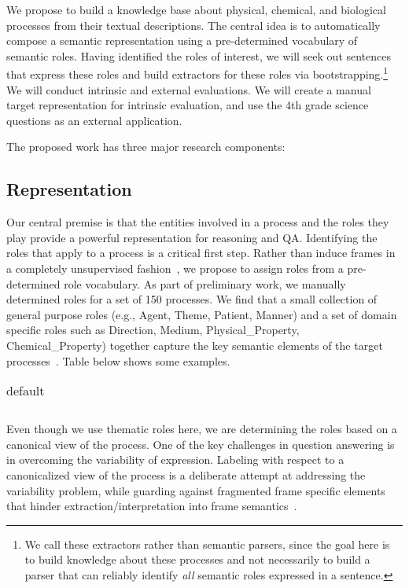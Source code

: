 We propose to build a knowledge base about physical, chemical, and biological processes from their textual descriptions. 
The central idea is to automatically compose a semantic representation using a pre-determined vocabulary of semantic roles. 
Having identified the roles of interest, we will seek out sentences that express these roles and build extractors for these roles via bootstrapping.\footnote{
We call these extractors rather than semantic parsers, since the goal here is to build knowledge about these processes and 
not necessarily to build a parser that can reliably identify {\em all} semantic roles expressed in a sentence.} 
We will conduct intrinsic and external evaluations. 
We will create a manual target representation for intrinsic evaluation, and use the 4th grade science questions as an external application.

The proposed work has three major research components:

\subsection{Representation}

Our central premise is that the entities involved in a process and the roles they play provide a powerful representation for reasoning and QA. 
Identifying the roles that apply to a process is a critical first step. 
Rather than induce frames in a completely unsupervised fashion~\cite{oconnonr2013:arxiv,modi2012:naacl,chen2013:ASRU}, 
we propose to assign roles from a pre-determined role vocabulary. 
As part of preliminary work, we manually determined roles for a set of 150 processes. 
We find that a small collection of general purpose roles (e.g., Agent, Theme, Patient, Manner) and 
a set of domain specific roles such as Direction, Medium, Physical\_Property, Chemical\_Property)  
together capture the key semantic elements of the target processes~\cite{louvan2015:kcap}. Table below shows some examples.

\begin{table}[htdp]
\caption{default}
\begin{center}
\begin{tabular}{|l|l|l|l|}

\end{tabular}
\end{center}
\label{default}
\end{table}%

Even though we use thematic roles here, we are determining the roles based on a canonical view of the process. One of the key challenges in question answering is in overcoming the variability of expression. Labeling with respect to a canonicalized view of the process is a deliberate attempt at addressing the variability problem, while guarding against fragmented frame specific elements that hinder extraction/interpretation into frame semantics~\cite{???}. 

